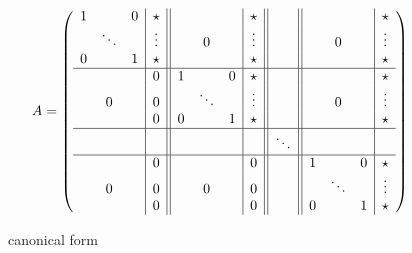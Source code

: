 \documentclass[11pt,oneside,english]{amsart}
\makeatletter
\numberwithin{equation}{section}
\numberwithin{figure}{section}
\theoremstyle{plain}
\theoremstyle{definition}
\theoremstyle{definition}
\theoremstyle{remark}
\theoremstyle{plain}
\theoremstyle{plain}
\theoremstyle{plain}
\theoremstyle{problem@}
\makeatother
\begin{document}
\begin{figure}
\[
A=\left(\begin{array}{ccc|c||ccc|c||c||ccc|c}
1 &  & 0 & \star &  &  &  & \star &  &  &  &  & \star\\
 & \ddots &  & \vdots &  & 0 &  & \vdots &  &  & 0 &  & \vdots\\
0 &  & 1 & \star &  &  &  & \star &  &  &  &  & \star\\
\hline  &  &  & 0 & 1 &  & 0 & \star &  &  &  &  & \star\\
 & 0 &  & 0 &  & \ddots &  & \vdots &  &  & 0 &  & \vdots\\
 &  &  & 0 & 0 &  & 1 & \star &  &  &  &  & \star\\
\hline  &  &  &  &  &  &  &  & \ddots & & & & \\
\hline  &  &  & 0 &  &  &  & 0 &  & 1 &  & 0 & \star\\
 & 0 &  & 0 &  & 0 &  & 0 &  &  & \ddots &  & \vdots\\
 &  &  & 0 &  &  &  & 0 &  & 0 &  & 1 & \star\end{array}\right)\]

\caption{\label{fig:l-can-form}canonical form}

\end{figure}
\end{document}
